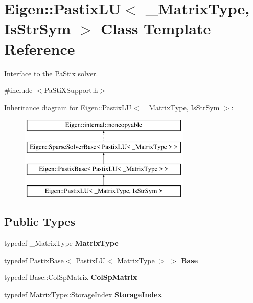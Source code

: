 \hypertarget{class_eigen_1_1_pastix_l_u}{}\section{Eigen\+::Pastix\+LU$<$ \+\_\+\+Matrix\+Type, Is\+Str\+Sym $>$ Class Template Reference}
\label{class_eigen_1_1_pastix_l_u}


Interface to the Pa\+Stix solver.  




{\ttfamily \#include $<$Pa\+Sti\+X\+Support.\+h$>$}

Inheritance diagram for Eigen\+::Pastix\+LU$<$ \+\_\+\+Matrix\+Type, Is\+Str\+Sym $>$\+:\begin{figure}[H]
\begin{center}
\leavevmode
\includegraphics[height=4.000000cm]{class_eigen_1_1_pastix_l_u}
\end{center}
\end{figure}
\subsection*{Public Types}
\begin{DoxyCompactItemize}
\item 
\mbox{\label{class_eigen_1_1_pastix_l_u_a381b6169c2fc056bef401bb621d72b66}} 
typedef \+\_\+\+Matrix\+Type {\bfseries Matrix\+Type}
\item 
\mbox{\label{class_eigen_1_1_pastix_l_u_ad19f8707fc3e419710cfbd7d1f4595a7}} 
typedef \mbox{\hyperlink{class_eigen_1_1_pastix_base}{Pastix\+Base}}$<$ \mbox{\hyperlink{class_eigen_1_1_pastix_l_u}{Pastix\+LU}}$<$ Matrix\+Type $>$ $>$ {\bfseries Base}
\item 
\mbox{\label{class_eigen_1_1_pastix_l_u_ab010577a9123541027c9fc89db42107c}} 
typedef \mbox{\hyperlink{class_eigen_1_1_sparse_matrix}{Base\+::\+Col\+Sp\+Matrix}} {\bfseries Col\+Sp\+Matrix}
\item 
\mbox{\label{class_eigen_1_1_pastix_l_u_a34946041be30db32d0511da40e542406}} 
typedef Matrix\+Type\+::\+Storage\+Index {\bfseries Storage\+Index}
\end{DoxyCompactItemize}
